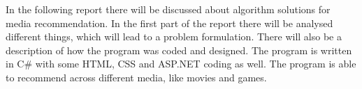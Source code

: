 In the following report there will be discussed about algorithm solutions for media recommendation. In the first part of the report there will be analysed different things, which will lead to a problem formulation. There will also be a description of how the program was coded and designed. The program is written in C# with some HTML, CSS and ASP.NET coding as well. The program is able to recommend across different media, like movies and games.  
